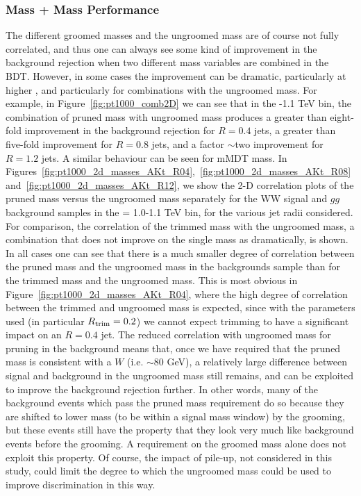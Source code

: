 \subsubsection{Mass + Mass Performance}

The different groomed masses and the ungroomed mass are of course not
fully correlated, and thus one can always see some kind of improvement
in the background rejection when two different mass variables are combined
in the BDT. However, in some cases the improvement can be dramatic,
particularly at higher \pT, and particularly for combinations with the
ungroomed mass. For example, in Figure~\ref{fig:pt1000_comb2D} we can
see that in the -1.1 TeV bin, the combination of pruned mass with
ungroomed mass produces a greater than eight-fold improvement in the
background rejection for $R=0.4$ jets, a greater than five-fold
improvement for $R=0.8$ jets, and a factor $\sim$two improvement for
$R=1.2$ jets. A similar behaviour can be seen for mMDT mass. 
In Figures~\ref{fig:pt1000_2d_masses_AKt_R04},~\ref{fig:pt1000_2d_masses_AKt_R08}
and~\ref{fig:pt1000_2d_masses_AKt_R12}, we show the 2-D correlation plots of the pruned mass versus the
ungroomed mass separately for the WW signal and $gg$ background
samples in the \pT = 1.0-1.1 TeV bin, for the various jet radii
considered. For comparison, the correlation of the trimmed mass with
the ungroomed mass, a combination that does not improve on the single
mass as dramatically, is shown. In all cases one can see that there is
a much smaller degree of correlation between the pruned mass and the
ungroomed mass in the backgrounds sample than for the trimmed mass and the ungroomed mass. This
is most obvious in Figure~\ref{fig:pt1000_2d_masses_AKt_R04}, where
the high degree of correlation between the trimmed and ungroomed mass
is expected, since with the parameters used (in particular
$R_{\rm trim} = 0.2$) we cannot expect trimming to have a significant
impact on an $R=0.4$ jet. The reduced correlation with ungroomed mass
for pruning in the background means that, once we have required that the
pruned mass is consistent with a $W$ (i.e. $\sim$80 GeV), a relatively large difference
between signal and background in the ungroomed mass still remains, and
can be exploited to improve the background rejection further. In other
words, many of the background events which pass the pruned mass
requirement do so because they are shifted to lower mass (to be within
a signal mass window) by the grooming, but these events still have the
property that they look very much like background events before the
grooming. A  requirement on the groomed mass alone does not
exploit this property. Of course, the impact of pile-up, not considered in this
study, could limit the degree to which the ungroomed
mass could be used to improve discrimination in this way. 

